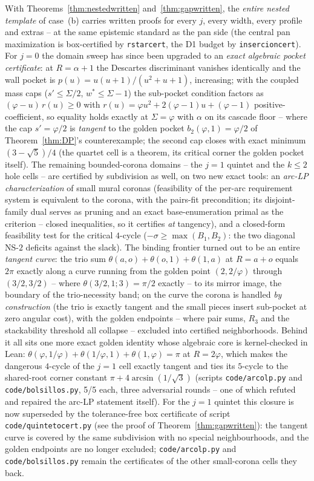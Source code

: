 \documentclass[11pt]{article}
\theoremstyle{definition}
\begin{document}
With Theorems~\ref{thm:nestedwritten} and~\ref{thm:gapwritten}, the
\emph{entire nested template} of case~(b) carries written proofs for
every $j$, every width, every profile and extras -- at the same
epistemic standard as the pan side (the central pan maximization is
box-certified by \texttt{rstarcert}, the D1 budget by
\texttt{insercioncert}). For $j=0$ the domain sweep has since been upgraded to an
\emph{exact algebraic pocket certificate}: at $R=\alpha+1$ the
Descartes discriminant vanishes identically and the wall pocket is
$p(u)=u(u+1)/(u^2+u+1)$, increasing; with the coupled mass caps
($s'\le\Sigma/2$, $w^*\le\Sigma-1$) the sub-pocket condition
factors as $(\varphi-u)\,r(u)\ge0$ with
$r(u)=\varphi u^2+2(\varphi-1)u+(\varphi-1)$
positive-coefficient, so equality holds exactly at $\Sigma=\varphi$
with $\alpha$ on its cascade floor -- where the cap
$s'=\varphi/2$ is \emph{tangent} to the golden pocket
$b_2(\varphi,1)=\varphi/2$ of Theorem~\ref{thm:DP}'s
counterexample; the second cap closes with exact minimum
$(3-\sqrt5)/4$ (the quartet cell is a theorem, its critical corner
the golden pocket itself). The remaining bounded-corona domains --
the $j=1$ quintet and the $k\le2$ hole cells -- are certified by
subdivision as well, on two new exact tools: an \emph{arc-LP
characterization} of small mural coronas (feasibility of the
per-arc requirement system is equivalent to the corona, with the
pairs-fit precondition; its disjoint-family dual serves as pruning
and an exact base-enumeration primal as the criterion -- closed
inequalities, so it certifies \emph{at} tangency), and a
closed-form feasibility test for the critical $4$-cycle
($-\sigma\ge\max(B_1,B_2)$: the two diagonal NS-$2$ deficits
against the slack). The binding frontier turned out to be an
entire \emph{tangent curve}: the trio sum
$\theta(a,o)+\theta(o,1)+\theta(1,a)$ at $R=a+o$ equals $2\pi$
exactly along a curve running from the golden point $(2,2/\varphi)$
through $(3/2,3/2)$ -- where $\theta(3/2,1;3)=\pi/2$ exactly -- to
its mirror image, the boundary of the trio-necessity band; on the
curve the corona is handled \emph{by construction} (the trio is
exactly tangent and the small pieces insert sub-pocket at zero
angular cost), with the golden endpoints -- where pair sums, $R_3$
and the stackability threshold all collapse -- excluded into
certified neighborhoods. Behind it all sits one more exact golden
identity whose algebraic core is kernel-checked in Lean:
$\theta(\varphi,1/\varphi)+\theta(1/\varphi,1)+\theta(1,\varphi)
=\pi$ at $R=2\varphi$, which makes the dangerous $4$-cycle of the
$j=1$ cell exactly tangent and ties its $5$-cycle to the
shared-root corner constant $\pi+4\arcsin(1/\sqrt3)$ (scripts
\texttt{code/arcolp.py} and \texttt{code/bolsillos.py}, 5/5 each,
three adversarial rounds -- one of which refuted and repaired the
arc-LP statement itself). For the $j=1$ quintet this closure is
now superseded by the tolerance-free box certificate of script
\texttt{code/quintetocert.py} (see the proof of
Theorem~\ref{thm:gapwritten}): the tangent curve is covered by
the same subdivision with no special neighbourhoods, and the
golden endpoints are no longer excluded; \texttt{code/arcolp.py}
and \texttt{code/bolsillos.py} remain the certificates of the
other small-corona cells they back.
\end{document}
